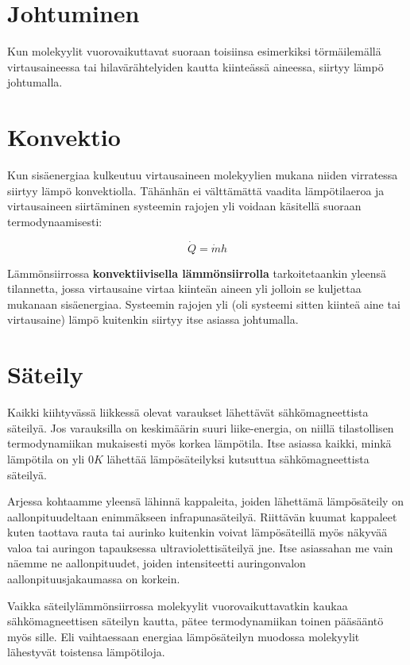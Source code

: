\documentclass[12pt,a4paper,finnish]{book}
\begin{document}
\section{Johtuminen}
Kun molekyylit vuorovaikuttavat suoraan toisiinsa esimerkiksi törmäilemällä virtausaineessa 
tai hilavärähtelyiden kautta kiinteässä aineessa, siirtyy lämpö johtumalla.

\section{Konvektio}
Kun sisäenergiaa kulkeutuu virtausaineen molekyylien mukana niiden virratessa siirtyy 
lämpö konvektiolla. Tähänhän ei välttämättä vaadita lämpötilaeroa ja virtausaineen 
siirtäminen systeemin rajojen yli voidaan käsitellä suoraan termodynaamisesti:

\begin{equation}
 \dot{Q} = \dot{m}h
\end{equation}

Lämmönsiirrossa \textbf{konvektiivisella lämmönsiirrolla} tarkoitetaankin yleensä 
tilannetta, jossa virtausaine virtaa kiinteän aineen yli jolloin se kuljettaa 
mukanaan sisäenergiaa. Systeemin rajojen yli (oli systeemi sitten kiinteä aine tai 
virtausaine) lämpö kuitenkin siirtyy itse asiassa johtumalla.

\section{Säteily}
Kaikki kiihtyvässä liikkessä olevat varaukset lähettävät sähkömagneettista säteilyä. 
Jos varauksilla on keskimäärin suuri liike-energia, on niillä tilastollisen 
termodynamiikan mukaisesti myös korkea lämpötila. Itse asiassa kaikki, minkä 
lämpötila on yli $0 K$ lähettää lämpösäteilyksi kutsuttua sähkömagneettista säteilyä. 

Arjessa kohtaamme yleensä lähinnä kappaleita, joiden lähettämä lämpösäteily on 
aallonpituudeltaan enimmäkseen infrapunasäteilyä. Riittävän kuumat kappaleet kuten 
taottava rauta tai aurinko kuitenkin voivat lämpösäteillä myös näkyvää valoa tai 
auringon tapauksessa ultraviolettisäteilyä jne. Itse asiassahan me vain näemme ne 
aallonpituudet, joiden intensiteetti auringonvalon aallonpituusjakaumassa on korkein.

Vaikka säteilylämmönsiirrossa molekyylit vuorovaikuttavatkin kaukaa sähkömagneettisen 
säteilyn kautta, pätee termodynamiikan toinen pääsääntö myös sille. Eli vaihtaessaan 
energiaa lämpösäteilyn muodossa molekyylit lähestyvät toistensa lämpötiloja.
\end{document}

